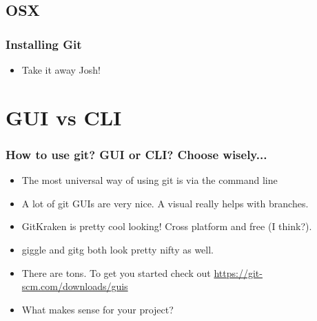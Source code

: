 \documentclass{beamer}
\begin{document}
\subsection{OSX}
\begin{frame}
    \frametitle{Installing Git}
    \begin{itemize}

        \item{Take it away Josh!}


    \end{itemize}

\end{frame} 

\section{GUI vs CLI}
\begin{frame}
    \frametitle{How to use git? GUI or CLI? Choose wisely...}
    \begin{itemize}
        \item{The most universal way of using git is via the command line}
        \item{A lot of git GUIs are very nice. A visual really helps with branches.}
        \item{GitKraken is pretty cool looking! Cross platform and free (I think?).}
        \item{giggle and gitg both look pretty nifty as well.}
        \item{There are tons. To get you started check out \url{https://git-scm.com/downloads/guis}}
        \item{What makes sense for your project?}
    \end{itemize}
\end{frame}
\end{document}
